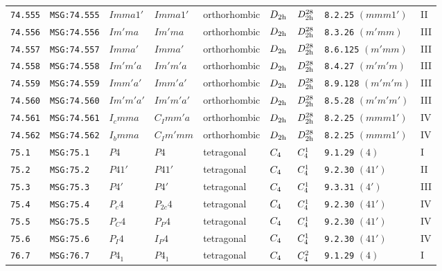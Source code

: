 \documentclass[fleqn,10pt]{jsarticle}
\begin{document}
\begin{center}
\begin{longtable}{lllllllll}
\texttt{74.555} & \texttt{MSG:74.555} & $Imma1'$ & $Imma1'$ & orthorhombic & $D_{\rm 2h}$ & $D_{\rm 2h}^{28}$ & \texttt{8.2.25} $(mmm1')$ & II \\
\texttt{74.556} & \texttt{MSG:74.556} & $Im'ma$ & $Im'ma$ & orthorhombic & $D_{\rm 2h}$ & $D_{\rm 2h}^{28}$ & \texttt{8.3.26} $(m'mm)$ & III \\
\texttt{74.557} & \texttt{MSG:74.557} & $Imma'$ & $Imma'$ & orthorhombic & $D_{\rm 2h}$ & $D_{\rm 2h}^{28}$ & \texttt{8.6.125} $(m'mm)$ & III \\
\texttt{74.558} & \texttt{MSG:74.558} & $Im'm'a$ & $Im'm'a$ & orthorhombic & $D_{\rm 2h}$ & $D_{\rm 2h}^{28}$ & \texttt{8.4.27} $(m'm'm)$ & III \\
\texttt{74.559} & \texttt{MSG:74.559} & $Imm'a'$ & $Imm'a'$ & orthorhombic & $D_{\rm 2h}$ & $D_{\rm 2h}^{28}$ & \texttt{8.9.128} $(m'm'm)$ & III \\
\texttt{74.560} & \texttt{MSG:74.560} & $Im'm'a'$ & $Im'm'a'$ & orthorhombic & $D_{\rm 2h}$ & $D_{\rm 2h}^{28}$ & \texttt{8.5.28} $(m'm'm')$ & III \\
\texttt{74.561} & \texttt{MSG:74.561} & $I_{c}mma$ & $C_{I}mm'a$ & orthorhombic & $D_{\rm 2h}$ & $D_{\rm 2h}^{28}$ & \texttt{8.2.25} $(mmm1')$ & IV \\
\texttt{74.562} & \texttt{MSG:74.562} & $I_{b}mma$ & $C_{I}m'mm$ & orthorhombic & $D_{\rm 2h}$ & $D_{\rm 2h}^{28}$ & \texttt{8.2.25} $(mmm1')$ & IV \\ \hline
\texttt{75.1} & \texttt{MSG:75.1} & $P4$ & $P4$ & tetragonal & $C_{\rm 4}$ & $C_{\rm 4}^{1}$ & \texttt{9.1.29} $(4)$ & I \\
\texttt{75.2} & \texttt{MSG:75.2} & $P41'$ & $P41'$ & tetragonal & $C_{\rm 4}$ & $C_{\rm 4}^{1}$ & \texttt{9.2.30} $(41')$ & II \\
\texttt{75.3} & \texttt{MSG:75.3} & $P4'$ & $P4'$ & tetragonal & $C_{\rm 4}$ & $C_{\rm 4}^{1}$ & \texttt{9.3.31} $(4')$ & III \\
\texttt{75.4} & \texttt{MSG:75.4} & $P_{c}4$ & $P_{2c}4$ & tetragonal & $C_{\rm 4}$ & $C_{\rm 4}^{1}$ & \texttt{9.2.30} $(41')$ & IV \\
\texttt{75.5} & \texttt{MSG:75.5} & $P_{C}4$ & $P_{P}4$ & tetragonal & $C_{\rm 4}$ & $C_{\rm 4}^{1}$ & \texttt{9.2.30} $(41')$ & IV \\
\texttt{75.6} & \texttt{MSG:75.6} & $P_{I}4$ & $I_{P}4$ & tetragonal & $C_{\rm 4}$ & $C_{\rm 4}^{1}$ & \texttt{9.2.30} $(41')$ & IV \\ \hline
\texttt{76.7} & \texttt{MSG:76.7} & $P4_{1}$ & $P4_{1}$ & tetragonal & $C_{\rm 4}$ & $C_{\rm 4}^{2}$ & \texttt{9.1.29} $(4)$ & I \\

\end{longtable}
\end{center}
\end{document}
